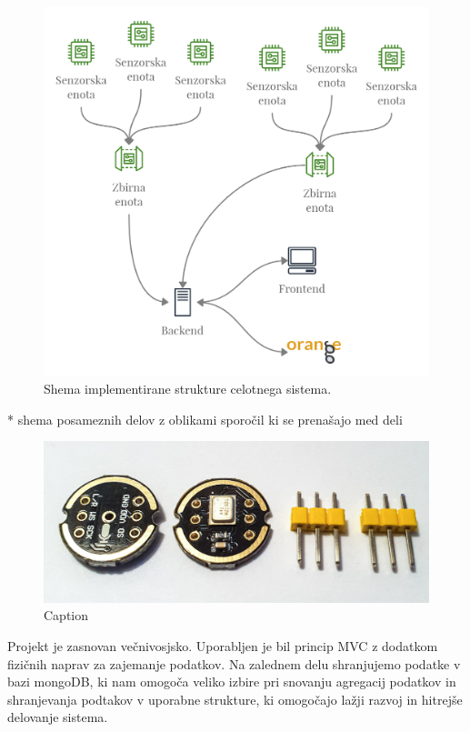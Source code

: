 \documentclass[a4paper, 12pt]{book}
\begin{document}
\begin{figure}[H]
    \centering
    \includegraphics[width=\linewidth]{slikovno_gradivo/Shema celote arhitekture (2).png}
    \caption{Shema implementirane strukture celotnega sistema.}
    \label{fig:arhiterktura}
\end{figure}
* shema posameznih delov z oblikami sporočil ki se prenašajo med deli
\begin{figure}[H]
    \centering
    \includegraphics[width=\linewidth]{slikovno_gradivo/INMP441_1.jpg}
    \caption{Caption}
    \label{fig:INMP441}
\end{figure}

Projekt je zasnovan večnivosjsko. Uporabljen je bil princip MVC z dodatkom fizičnih naprav za zajemanje podatkov. Na zalednem delu shranjujemo podatke v bazi mongoDB, ki nam omogoča veliko izbire pri snovanju agregacij podatkov in shranjevanja podtakov v uporabne strukture, ki omogočajo lažji razvoj in hitrejše delovanje sistema. 
\end{document}
